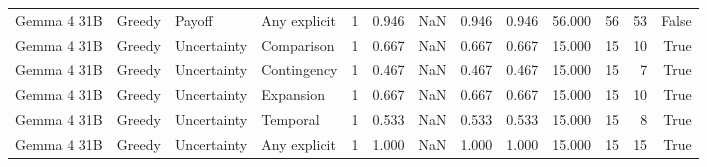 \begin{tabular}{llllrrrrrrrrr}
Gemma 4 31B & Greedy & Payoff & Any explicit & 1 & 0.946 & NaN & 0.946 & 0.946 & 56.000 & 56 & 53 & False \\
Gemma 4 31B & Greedy & Uncertainty & Comparison & 1 & 0.667 & NaN & 0.667 & 0.667 & 15.000 & 15 & 10 & True \\
Gemma 4 31B & Greedy & Uncertainty & Contingency & 1 & 0.467 & NaN & 0.467 & 0.467 & 15.000 & 15 & 7 & True \\
Gemma 4 31B & Greedy & Uncertainty & Expansion & 1 & 0.667 & NaN & 0.667 & 0.667 & 15.000 & 15 & 10 & True \\
Gemma 4 31B & Greedy & Uncertainty & Temporal & 1 & 0.533 & NaN & 0.533 & 0.533 & 15.000 & 15 & 8 & True \\
Gemma 4 31B & Greedy & Uncertainty & Any explicit & 1 & 1.000 & NaN & 1.000 & 1.000 & 15.000 & 15 & 15 & True \\
\bottomrule
\end{tabular}
